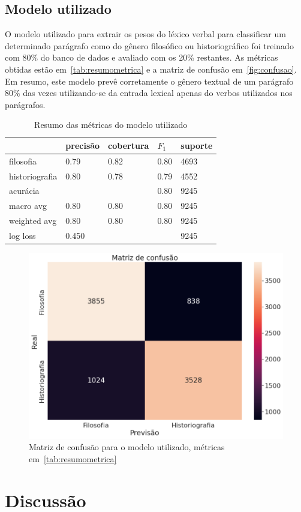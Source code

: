 \documentclass[a4paper,article,12pt,oneside]{memoir}
\begin{document}
\section{Modelo utilizado}

O modelo utilizado para extrair os pesos do léxico verbal para classificar um determinado parágrafo como do gênero filosófico ou historiográfico foi treinado com 80\% do banco de dados e avaliado com os 20\% restantes.
As métricas obtidas estão em~\autoref{tab:resumometrica} e a matriz de confusão em~\autoref{fig:confusao}.
Em resumo, este modelo prevê corretamente o gênero textual de um parágrafo 80\% das vezes utilizando-se da entrada lexical apenas do verbos utilizados nos parágrafos.

\begin{table}[!ht]
	\centering
	\begin{tabular}{lllll}
		\toprule
		{}             & precisão & cobertura & $F_1$ & suporte \\
		\midrule
		filosofia      & 0.79     & 0.82      & 0.80  & 4693    \\
		historiografia & 0.80     & 0.78      & 0.79  & 4552    \\
		\midrule
		acurácia       &          &           & 0.80  & 9245    \\
		macro avg      & 0.80     & 0.80      & 0.80  & 9245    \\
		weighted avg   & 0.80     & 0.80      & 0.80  & 9245    \\
		\midrule
		\midrule
		log loss       & 0.450    &           &       & 9245    \\
		\bottomrule
	\end{tabular}
	\caption{Resumo das métricas do modelo utilizado}\label{tab:resumometrica}
\end{table}

\begin{figure}[!ht]
	\begin{center}
		\includegraphics[width=.6\linewidth]{./figs/confusao.png}
	\end{center}
	\caption{Matriz de confusão para o modelo utilizado, métricas em~\autoref{tab:resumometrica}}\label{fig:confusao}
\end{figure}


\chapter{Discussão}

\printbibliography%
\end{document}
